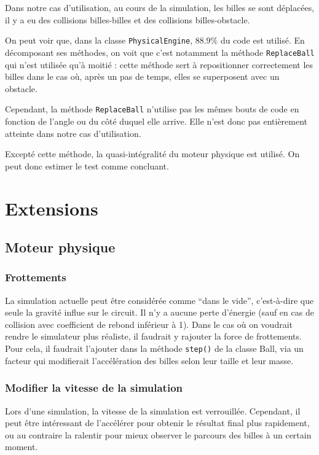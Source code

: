 \documentclass{report}
\begin{document}
Dans notre cas d’utilisation, au cours de la simulation, les billes se sont déplacées, il y a eu des collisions billes-billes et des collisions billes-obstacle.

On peut voir que, dans la classe \texttt{PhysicalEngine}, 88.9\% du code est utilisé. En décomposant ses méthodes, on voit que c’est notamment la méthode \texttt{ReplaceBall} qui n’est utilisée qu’à moitié : cette méthode sert à repositionner correctement les billes dans le cas où, après un pas de temps, elles se superposent avec un obstacle.

Cependant, la méthode \texttt{ReplaceBall} n’utilise pas les mêmes bouts de code en fonction de l’angle ou du côté duquel elle arrive. Elle n’est donc pas entièrement atteinte dans notre cas d’utilisation.

Excepté cette méthode, la quasi-intégralité du moteur physique est utilisé. On peut donc estimer le test comme concluant.


\chapter{Extensions}

\section{Moteur physique}

\subsection{Frottements}

La simulation actuelle peut être considérée comme “dans le vide”, c’est-à-dire que seule la gravité influe sur le circuit. Il n’y a aucune perte d’énergie (sauf en cas de collision avec coefficient de rebond inférieur à 1). Dans le cas où on voudrait rendre le simulateur plus réaliste, il faudrait y rajouter la force de frottements. \\

Pour cela, il faudrait l'ajouter dans la méthode \texttt{step()} de la classe Ball, via un facteur qui modifierait l’accélération des billes selon leur taille et leur masse.

\subsection{Modifier la vitesse de la simulation}

Lors d’une simulation, la vitesse de la simulation est verrouillée. Cependant, il peut être intéressant de l’accélérer pour obtenir le résultat final plus rapidement, ou au contraire la ralentir pour mieux observer le parcours des billes à un certain moment. \\
\end{document}
